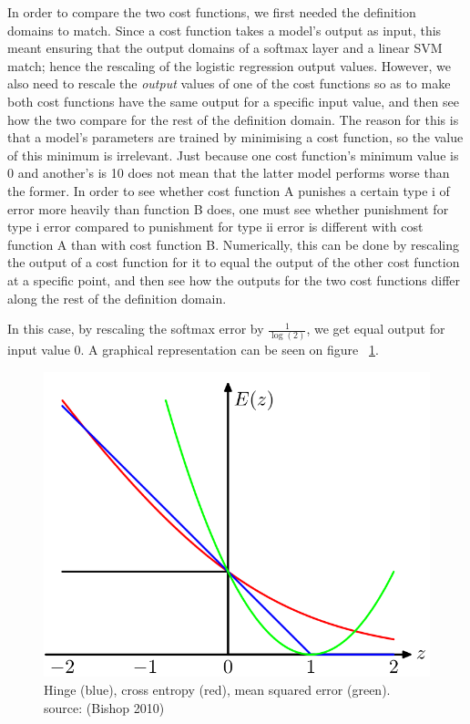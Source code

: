 \documentclass[a4paper,11pt]{article}
\begin{document}
In order to compare the two cost functions, we first needed the definition domains to match. Since a cost function takes a model's output as input, this meant ensuring that the output domains of a softmax layer and a linear SVM match; hence the rescaling of the logistic regression output values. However, we also need to rescale the \textit{output} values of one of the cost functions so as to make both cost functions have the same output for a specific input value, and then see how the two compare for the rest of the definition domain. The reason for this is that a model's parameters are trained by minimising a cost function, so the value of this minimum is irrelevant. Just because one cost function's minimum value is 0 and another's is 10 does not mean that the latter model performs worse than the former. In order to see whether cost function A punishes a certain type i of error more heavily than function B does, one must see whether punishment for type i error compared to punishment for type ii error is different with cost function A than with cost function B. Numerically, this can be done by rescaling the output of a cost function for it to equal the output of the other cost function at a specific point, and then see how the outputs for the two cost functions differ along the rest of the definition domain.

In this case, by rescaling the softmax error by $\frac{1}{\log(2)}$, we get equal output for input value 0. A graphical representation can be seen on figure ~\ref{f40}. \\

\begin{figure}[h!]
	\centering
	\includegraphics[scale=0.3]{images/hinge_vs_ce.png}
	\caption{Hinge (blue), cross entropy (red), mean squared error (green). source: (Bishop 2010)}
    \label{f40}
\end{figure}
\end{document}
